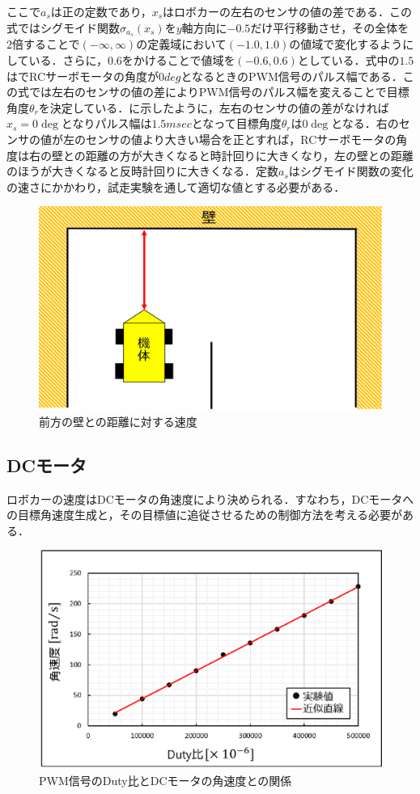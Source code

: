 \newpage
ここで$ a_{s}$は正の定数であり，$ x_{s}$はロボカーの左右のセンサの値の差である．この式ではシグモイド関数$\sigma_{a_{s}}(x_{s}) $を$y$軸方向に$-0.5$だけ平行移動させ，その全体を$2$倍することで$(-\infty,\infty)$の定義域において$(-1.0,1.0)$の値域で変化するようにしている．さらに，$0.6$をかけることで値域を$(-0.6,0.6)$としている．式中の$1.5$はでRCサーボモータの角度が$0\unit{deg}$となるときのPWM信号のパルス幅である．この式では左右のセンサの値の差によりPWM信号のパルス幅を変えることで目標角度$\theta_{r} $を決定している．に示したように，左右のセンサの値の差がなければ$x_{s}=0\unit{\deg}$となりパルス幅は$1.5\unit{msec}$となって目標角度$\theta_{r}$は$0\unit{\deg}$となる．右のセンサの値が左のセンサの値より大きい場合を正とすれば，RCサーボモータの角度は右の壁との距離の方が大きくなると時計回りに大きくなり，左の壁との距離のほうが大きくなると反時計回りに大きくなる．定数$a_{s}$はシグモイド関数の変化の速さにかかわり，試走実験を通して適切な値とする必要がある．

\newpage
 \begin{figure}[htb]
  \centering
    \includegraphics[width=0.6\hsize]{picture/eps/speed_wall.eps}
  \caption{前方の壁との距離に対する速度}
  \label{fig::speed_wall}
\end{figure}
\subsection{DCモータ}
ロボカーの速度はDCモータの角速度により決められる．すなわち，DCモータへの目標角速度生成と，その目標値に追従させるための制御方法を考える必要がある．

\begin{figure}[htb]
  \centering
    \includegraphics[width=0.7\hsize]{picture/eps/duty_angvel_graph.eps}
  \caption{PWM信号のDuty比とDCモータの角速度との関係}
  \label{fig::duty_angvel_graph}
\end{figure}

